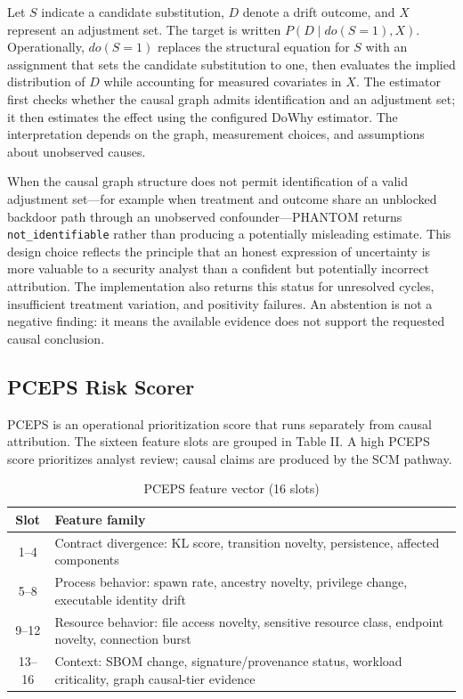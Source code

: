 \documentclass[conference]{IEEEtran}
\begin{document}
Let $S$ indicate a candidate substitution, $D$ denote a drift outcome, and $X$ represent an adjustment set. The target is written $P(D\mid do(S=1),X)$. Operationally, $do(S=1)$ replaces the structural equation for $S$ with an assignment that sets the candidate substitution to one, then evaluates the implied distribution of $D$ while accounting for measured covariates in $X$. The estimator first checks whether the causal graph admits identification and an adjustment set; it then estimates the effect using the configured DoWhy estimator. The interpretation depends on the graph, measurement choices, and assumptions about unobserved causes.

When the causal graph structure does not permit identification of a valid adjustment set—for example when treatment and outcome share an unblocked backdoor path through an unobserved confounder—PHANTOM returns \texttt{not\_identifiable} rather than producing a potentially misleading estimate. This design choice reflects the principle that an honest expression of uncertainty is more valuable to a security analyst than a confident but potentially incorrect attribution. The implementation also returns this status for unresolved cycles, insufficient treatment variation, and positivity failures. An abstention is not a negative finding: it means the available evidence does not support the requested causal conclusion.

\subsection{PCEPS Risk Scorer}
PCEPS is an operational prioritization score that runs separately from causal attribution. The sixteen feature slots are grouped in Table II. A high PCEPS score prioritizes analyst review; causal claims are produced by the SCM pathway.
\begin{table}[t]\caption{PCEPS feature vector (16 slots)}\label{tab:pceps}\centering\small\begin{tabularx}{\columnwidth}{cX}\toprule Slot & Feature family\\\midrule
1--4 & Contract divergence: KL score, transition novelty, persistence, affected components\\
5--8 & Process behavior: spawn rate, ancestry novelty, privilege change, executable identity drift\\
9--12 & Resource behavior: file access novelty, sensitive resource class, endpoint novelty, connection burst\\
13--16 & Context: SBOM change, signature/provenance status, workload criticality, graph causal-tier evidence\\\bottomrule\end{tabularx}\end{table}
\end{document}
